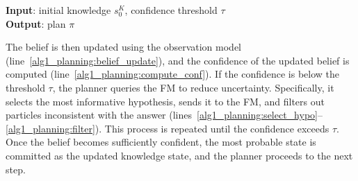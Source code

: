\begin{algorithm}[t]
\caption{Planning Pipeline}
\label{alg:online_planning}
\textbf{Input}: initial knowledge $s^{K}_{0}$, confidence threshold $\tau$ \\
\textbf{Output}: plan $\pi$
\BlankLine

\end{algorithm}

The belief is then updated using the observation model (line~\ref{alg1_planning:belief_update}), and the confidence of the updated belief is computed (line~\ref{alg1_planning:compute_conf}). If the confidence is below the threshold $\tau$, the planner queries the FM to reduce uncertainty. Specifically, it selects the most informative hypothesis, sends it to the FM, and filters out particles inconsistent with the answer (lines~\ref{alg1_planning:select_hypo}--\ref{alg1_planning:filter}). This process is repeated until the confidence exceeds $\tau$. Once the belief becomes sufficiently confident, the most probable state is committed as the updated knowledge state, and the planner proceeds to the next step.
